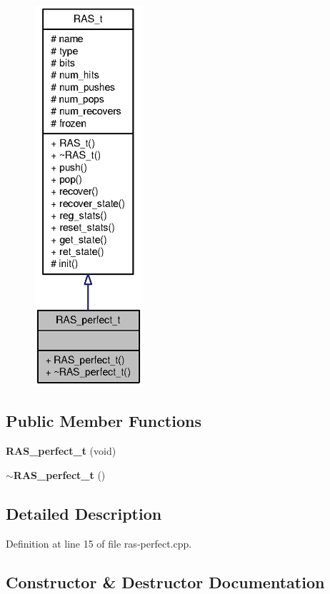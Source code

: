 \begin{figure}[H]
\begin{center}
\leavevmode
\includegraphics[height=400pt]{classRAS__perfect__t__coll__graph}
\end{center}
\end{figure}
\subsection*{Public Member Functions}
\begin{CompactItemize}
\item 
{\bf RAS\_\-perfect\_\-t} (void)
\item 
{\bf $\sim$RAS\_\-perfect\_\-t} ()
\end{CompactItemize}


\subsection{Detailed Description}


Definition at line 15 of file ras-perfect.cpp.

\subsection{Constructor \& Destructor Documentation}
